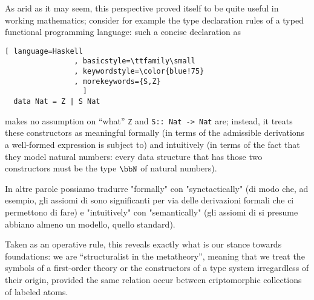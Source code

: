 As arid as it may seem, this perspective proved itself to be quite useful in working mathematics; consider for example the type declaration rules of a typed functional programming language: such a concise declaration as
\begin{lstlisting}[ language=Haskell
                , basicstyle=\ttfamily\small
                , keywordstyle=\color{blue!75}
                , morekeywords={S,Z}
                  ]
  data Nat = Z | S Nat
\end{lstlisting}
makes no assumption on ``what'' \verb|Z| and \verb|S:: Nat -> Nat| are; instead, it treats these constructors as meaningful formally (in terms of the admissible derivations a well-formed expression is subject to) and intuitively (in terms of the fact that they model natural numbers: every data structure that has those two constructors must be the type $\bbN$ of natural numbers).

In altre parole possiamo tradurre "formally" con "synctactically" (di modo che, ad esempio, gli assiomi di  sono significanti per via delle derivazioni formali che ci permettono di fare) e "intuitively" con "semantically" (gli assiomi di  si presume abbiano almeno un modello, quello standard).

Taken as an operative rule, this reveals exactly what is our stance towards foundations: we are ``structuralist in the metatheory'', meaning that we treat the symbols of a first-order theory or the constructors of a type system irregardless of their origin, provided the same relation occur between criptomorphic collections of labeled atoms.

